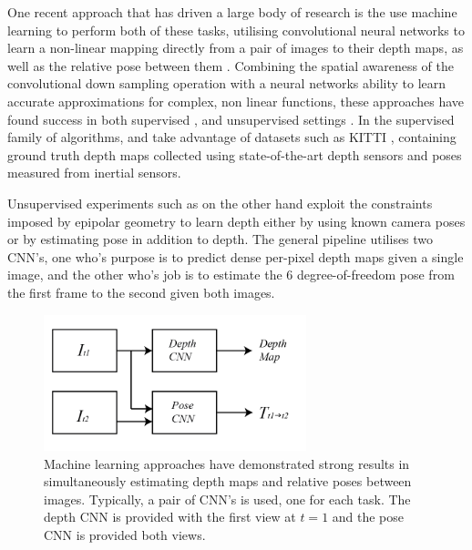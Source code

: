 \documentclass[openany]{book}
\begin{document}
One recent approach that has driven a large body of research is the use machine learning to perform both of these tasks, utilising convolutional neural networks to learn a non-linear mapping directly from a pair of images to their depth maps, as well as the relative pose between them \cite{eigen2014supervised, garg2016unsupervised,godard2016consistency, liu2015supervised, zhou2017unsupervised}. Combining the spatial awareness of the convolutional down sampling operation with a neural networks ability to learn accurate approximations for complex, non linear functions, these approaches have found success in both supervised \cite{liu2015supervised, eigen2014supervised}, and unsupervised settings \cite{garg2016unsupervised, godard2016consistency, zhou2017unsupervised}. In the supervised family of algorithms, \cite{eigen2014supervised} and \cite{liu2015supervised} take advantage of datasets such as KITTI \cite{dataset-kitti}, containing ground truth depth maps collected using state-of-the-art depth sensors and poses measured from inertial sensors. 

Unsupervised experiments such as \cite{garg2016unsupervised, godard2016consistency,zhou2017unsupervised} on the other hand exploit the constraints imposed by epipolar geometry to learn depth either by using known camera poses or by estimating pose in addition to depth. The general pipeline utilises two CNN's, one who's purpose is to predict dense per-pixel depth maps given a single image, and the other who's job is to estimate the 6 degree-of-freedom pose from the first frame to the second given both images.

\begin{figure}[htbp]
    \centering
    \includegraphics[width=3in]{images/cnns.png}
    \caption{Machine learning approaches have demonstrated strong results in simultaneously estimating depth maps and relative poses between images. Typically, a pair of CNN's is used, one for each task. The depth CNN is provided with the first view at $t=1$ and the pose CNN is provided both views.}
    \label{2cnns}
\end{figure}
\end{document}
